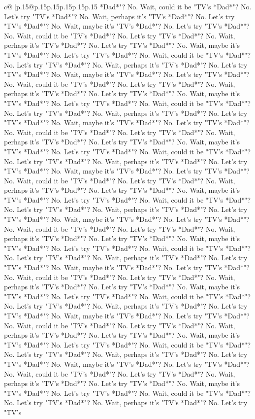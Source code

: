 \documentclass{article}
\begin{document}
{\begin{supertabular}{c@{$\;$}|p{.15\linewidth}@{}p{.15\linewidth}p{.15\linewidth}p{.15\linewidth}p{.15\linewidth}p{.15\linewidth}}
{{{*Dad*"? No. Wait, could it be "TV's *Dad*"? No. Let's try "TV's *Dad*"? No. Wait, perhaps it's "TV's *Dad*"? No. Let's try "TV's *Dad*"? No. Wait, maybe it's "TV's *Dad*"? No. Let's try "TV's *Dad*"? No. Wait, could it be "TV's *Dad*"? No. Let's try "TV's *Dad*"? No. Wait, perhaps it's "TV's *Dad*"? No. Let's try "TV's *Dad*"? No. Wait, maybe it's "TV's *Dad*"? No. Let's try "TV's *Dad*"? No. Wait, could it be "TV's *Dad*"? No. Let's try "TV's *Dad*"? No. Wait, perhaps it's "TV's *Dad*"? No. Let's try "TV's *Dad*"? No. Wait, maybe it's "TV's *Dad*"? No. Let's try "TV's *Dad*"? No. Wait, could it be "TV's *Dad*"? No. Let's try "TV's *Dad*"? No. Wait, perhaps it's "TV's *Dad*"? No. Let's try "TV's *Dad*"? No. Wait, maybe it's "TV's *Dad*"? No. Let's try "TV's *Dad*"? No. Wait, could it be "TV's *Dad*"? No. Let's try "TV's *Dad*"? No. Wait, perhaps it's "TV's *Dad*"? No. Let's try "TV's *Dad*"? No. Wait, maybe it's "TV's *Dad*"? No. Let's try "TV's *Dad*"? No. Wait, could it be "TV's *Dad*"? No. Let's try "TV's *Dad*"? No. Wait, perhaps it's "TV's *Dad*"? No. Let's try "TV's *Dad*"? No. Wait, maybe it's "TV's *Dad*"? No. Let's try "TV's *Dad*"? No. Wait, could it be "TV's *Dad*"? No. Let's try "TV's *Dad*"? No. Wait, perhaps it's "TV's *Dad*"? No. Let's try "TV's *Dad*"? No. Wait, maybe it's "TV's *Dad*"? No. Let's try "TV's *Dad*"? No. Wait, could it be "TV's *Dad*"? No. Let's try "TV's *Dad*"? No. Wait, perhaps it's "TV's *Dad*"? No. Let's try "TV's *Dad*"? No. Wait, maybe it's "TV's *Dad*"? No. Let's try "TV's *Dad*"? No. Wait, could it be "TV's *Dad*"? No. Let's try "TV's *Dad*"? No. Wait, perhaps it's "TV's *Dad*"? No. Let's try "TV's *Dad*"? No. Wait, maybe it's "TV's *Dad*"? No. Let's try "TV's *Dad*"? No. Wait, could it be "TV's *Dad*"? No. Let's try "TV's *Dad*"? No. Wait, perhaps it's "TV's *Dad*"? No. Let's try "TV's *Dad*"? No. Wait, maybe it's "TV's *Dad*"? No. Let's try "TV's *Dad*"? No. Wait, could it be "TV's *Dad*"? No. Let's try "TV's *Dad*"? No. Wait, perhaps it's "TV's *Dad*"? No. Let's try "TV's *Dad*"? No. Wait, maybe it's "TV's *Dad*"? No. Let's try "TV's *Dad*"? No. Wait, could it be "TV's *Dad*"? No. Let's try "TV's *Dad*"? No. Wait, perhaps it's "TV's *Dad*"? No. Let's try "TV's *Dad*"? No. Wait, maybe it's "TV's *Dad*"? No. Let's try "TV's *Dad*"? No. Wait, could it be "TV's *Dad*"? No. Let's try "TV's *Dad*"? No. Wait, perhaps it's "TV's *Dad*"? No. Let's try "TV's *Dad*"? No. Wait, maybe it's "TV's *Dad*"? No. Let's try "TV's *Dad*"? No. Wait, could it be "TV's *Dad*"? No. Let's try "TV's *Dad*"? No. Wait, perhaps it's "TV's *Dad*"? No. Let's try "TV's *Dad*"? No. Wait, maybe it's "TV's *Dad*"? No. Let's try "TV's *Dad*"? No. Wait, could it be "TV's *Dad*"? No. Let's try "TV's *Dad*"? No. Wait, perhaps it's "TV's *Dad*"? No. Let's try "TV's *Dad*"? No. Wait, maybe it's "TV's *Dad*"? No. Let's try "TV's *Dad*"? No. Wait, could it be "TV's *Dad*"? No. Let's try "TV's *Dad*"? No. Wait, perhaps it's "TV's *Dad*"? No. Let's try "TV's *Dad*"? No. Wait, maybe it's "TV's *Dad*"? No. Let's try "TV's *Dad*"? No. Wait, could it be "TV's *Dad*"? No. Let's try "TV's *Dad*"? No. Wait, perhaps it's "TV's *Dad*"? No. Let's try "TV's }}}
\end{supertabular}}
\end{document}
